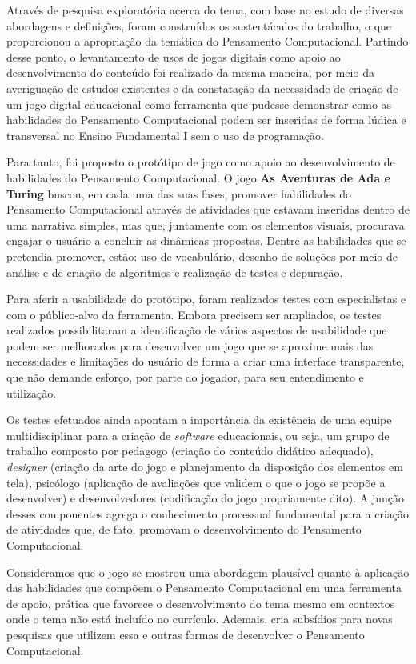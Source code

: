 Através de pesquisa exploratória acerca do tema, com base no estudo de diversas abordagens e definições, foram construídos os sustentáculos do trabalho, o que proporcionou a apropriação da temática do Pensamento Computacional. Partindo desse ponto, o levantamento de usos de jogos digitais como apoio ao desenvolvimento do conteúdo foi realizado da mesma maneira, por meio da averiguação de estudos existentes e da constatação da necessidade de criação de um jogo digital educacional como ferramenta que pudesse demonstrar como as habilidades do Pensamento Computacional podem ser inseridas de forma lúdica e transversal no Ensino Fundamental I sem o uso de programação. 
 
Para tanto, foi proposto o protótipo de jogo como apoio ao desenvolvimento de habilidades do Pensamento Computacional. O jogo \textbf{As Aventuras de Ada e Turing} buscou, em cada uma das suas fases, promover habilidades do Pensamento Computacional através de atividades que estavam inseridas dentro de uma narrativa simples, mas que, juntamente com os elementos visuais, procurava engajar o usuário a concluir as dinâmicas propostas. Dentre as habilidades que se pretendia promover, estão: uso de vocabulário, desenho de soluções por meio de análise e de criação de algoritmos e realização de testes e depuração. 

Para aferir a usabilidade do protótipo, foram realizados testes com especialistas e com o público-alvo da ferramenta. Embora precisem ser ampliados, os testes realizados possibilitaram a identificação de vários aspectos de usabilidade que podem ser melhorados para desenvolver um jogo que se aproxime mais das necessidades e limitações do usuário de forma a criar uma interface transparente, que não demande esforço, por parte do jogador, para seu entendimento e utilização.

Os testes efetuados ainda apontam a importância da existência de uma equipe multidisciplinar para a criação de \textit{software} educacionais, ou seja, um grupo de trabalho composto por pedagogo (criação do conteúdo didático adequado), \textit{designer} (criação da arte do jogo e planejamento da disposição dos elementos em tela), psicólogo (aplicação de avaliações que validem o que o jogo se propõe a desenvolver) e desenvolvedores (codificação do jogo propriamente dito). A junção desses componentes agrega o conhecimento processual fundamental para a criação de atividades que, de fato, promovam o desenvolvimento do Pensamento Computacional.

Consideramos que o jogo se mostrou uma abordagem plausível quanto à aplicação das habilidades que compõem o Pensamento Computacional em uma ferramenta de apoio, prática que favorece o desenvolvimento do tema mesmo em contextos onde o tema não está incluído no currículo. Ademais, cria subsídios para novas pesquisas que utilizem essa e outras formas de desenvolver o Pensamento Computacional. 

